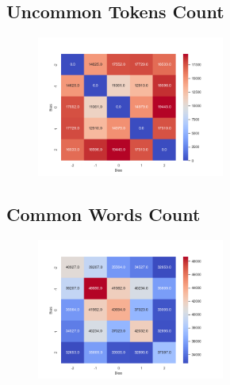\documentclass[11pt]{article}
\begin{document}
\subsection{Uncommon Tokens Count}
\begin{center}


\CountUCTTable
\begin{figure}[h!]
  \includegraphics[width=0.55\textwidth]{figs/count_cuc_words/uc_t.png}
\end{figure}
\end{center}


\subsection{Common Words Count}
\begin{center}


\CountCWTable
\begin{figure}[h!]
  \includegraphics[width=0.55\textwidth]{figs/count_cuc_words/c_w.png}
\end{figure}
\end{center}
\end{document}
